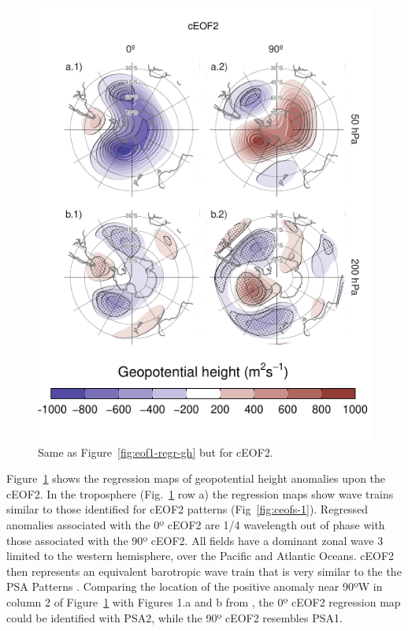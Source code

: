 \documentclass[pdflatex,sn-basic]{sn-jnl}
\theoremstyle{thmstyleone}%
\theoremstyle{thmstyletwo}%
\theoremstyle{thmstylethree}%
\begin{document}
\begin{figure}
\centering
\includegraphics{../figures/eof2-regr-gh-1.pdf}
\caption{\label{fig:eof2-regr-gh}Same as Figure~\ref{fig:eof1-regr-gh} but for cEOF2.}
\end{figure}

Figure~\ref{fig:eof2-regr-gh} shows the regression maps of geopotential height anomalies upon the cEOF2.
In the troposphere (Fig.~\ref{fig:eof2-regr-gh} row a) the regression maps show wave trains similar to those identified for cEOF2 patterns (Fig~\ref{fig:ceofs-1}).
Regressed anomalies associated with the 0º cEOF2 are 1/4 wavelength out of phase with those associated with the 90º cEOF2.
All fields have a dominant zonal wave 3 limited to the western hemisphere, over the Pacific and Atlantic Oceans.
cEOF2 then represents an equivalent barotropic wave train that is very similar to the the PSA Patterns \citep{mo2001}.
Comparing the location of the positive anomaly near 90ºW in column 2 of Figure~\ref{fig:eof2-regr-gh} with Figures 1.a and b from \citet{mo2001}, the 0º cEOF2 regression map could be identified with PSA2, while the 90º cEOF2 resembles PSA1.
\end{document}
